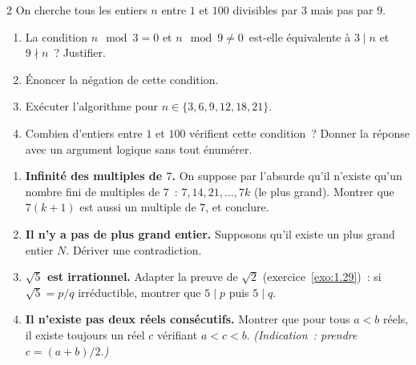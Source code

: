 \begin{probleme}{2}
On cherche tous les entiers $n$ entre $1$ et $100$ divisibles par $3$ mais pas par $9$.

\begin{algorithm}[H]
\caption{Divisible par 3 mais pas par 9}
\end{algorithm}

\begin{enumerate}
  \item La condition \og$n\mod3=0$ et $n\mod9\ne0$\fg\ est-elle
        \'equivalente \`a \og$3\mid n$ et $9\nmid n$\fg~? Justifier.
  \item \'Enoncer la n\'egation de cette condition.
  \item Ex\'ecuter l'algorithme pour $n\in\{3,6,9,12,18,21\}$.
  \item Combien d'entiers entre $1$ et $100$ v\'erifient cette condition~?
        Donner la r\'eponse avec un argument logique sans tout \'enum\'erer.
\end{enumerate}
\end{probleme}

\begin{challenge}
\begin{enumerate}
  \item \textbf{Infinit\'e des multiples de $7$.}
        On suppose par l'absurde qu'il n'existe qu'un nombre fini de
        multiples de $7$~: $7, 14, 21, \ldots, 7k$ (le plus grand).
        Montrer que $7(k+1)$ est aussi un multiple de $7$, et conclure.
  \item \textbf{Il n'y a pas de plus grand entier.}
        Supposons qu'il existe un plus grand entier $N$.
        D\'eriver une contradiction.
  \item \textbf{$\sqrt{5}$ est irrationnel.}
        Adapter la preuve de $\sqrt{2}$ (exercice~\ref{exo:1.29})~:
        si $\sqrt{5}=p/q$ irr\'eductible, montrer que $5\mid p$
        puis $5\mid q$.
  \item \textbf{Il n'existe pas deux r\'eels cons\'ecutifs.}
        Montrer que pour tous $a < b$ r\'eels, il existe toujours
        un r\'eel $c$ v\'erifiant $a < c < b$.
        \emph{(Indication~: prendre $c = (a+b)/2$.)}
\end{enumerate}
\end{challenge}

